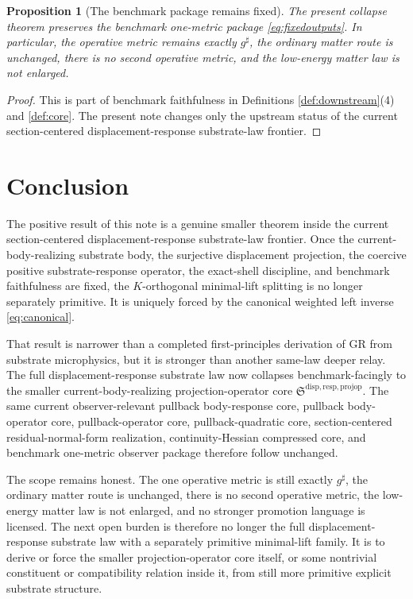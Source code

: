 \documentclass[11pt]{article}
\newcommand{\CompletedMetric}{g^{\sharp}}
\newcommand{\ProjectionOperatorCore}{\mathfrak S^{\mathrm{disp,resp,projop}}}
\newtheorem{proposition}{Proposition}
\begin{document}
\begin{proposition}[The benchmark package remains fixed]
\label{prop:benchmark}
The present collapse theorem preserves the benchmark one-metric package \eqref{eq:fixedoutputs}. In particular, the operative metric remains exactly \(\CompletedMetric\), the ordinary matter route is unchanged, there is no second operative metric, and the low-energy matter law is not enlarged.
\end{proposition}

\begin{proof}
This is part of benchmark faithfulness in Definitions \ref{def:downstream}(4) and \ref{def:core}. The present note changes only the upstream status of the current section-centered displacement-response substrate-law frontier.
\end{proof}

\section{Conclusion}

The positive result of this note is a genuine smaller theorem inside the current section-centered displacement-response substrate-law frontier. Once the current-body-realizing substrate body, the surjective displacement projection, the coercive positive substrate-response operator, the exact-shell discipline, and benchmark faithfulness are fixed, the \(K\)-orthogonal minimal-lift splitting is no longer separately primitive. It is uniquely forced by the canonical weighted left inverse \eqref{eq:canonical}.

That result is narrower than a completed first-principles derivation of GR from substrate microphysics, but it is stronger than another same-law deeper relay. The full displacement-response substrate law now collapses benchmark-facingly to the smaller current-body-realizing projection-operator core \(\ProjectionOperatorCore\). The same current observer-relevant pullback body-response core, pullback body-operator core, pullback-operator core, pullback-quadratic core, section-centered residual-normal-form realization, continuity-Hessian compressed core, and benchmark one-metric observer package therefore follow unchanged.

The scope remains honest. The one operative metric is still exactly \(\CompletedMetric\), the ordinary matter route is unchanged, there is no second operative metric, the low-energy matter law is not enlarged, and no stronger promotion language is licensed. The next open burden is therefore no longer the full displacement-response substrate law with a separately primitive minimal-lift family. It is to derive or force the smaller projection-operator core itself, or some nontrivial constituent or compatibility relation inside it, from still more primitive explicit substrate structure.
\end{document}
